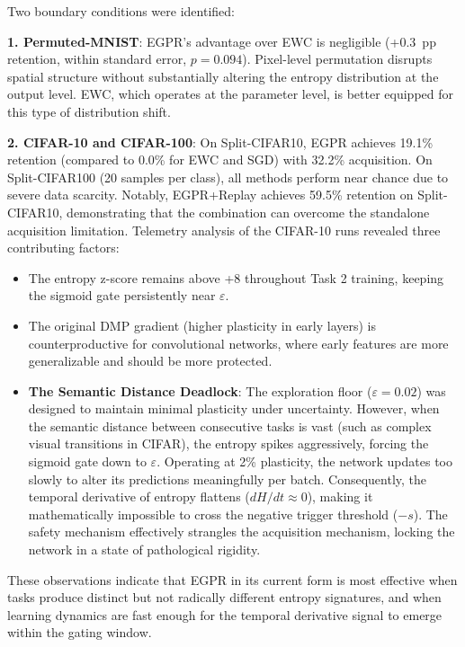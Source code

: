 \documentclass[11pt,a4paper]{article}
\begin{document}
Two boundary conditions were identified:

\textbf{1. Permuted-MNIST}: EGPR's advantage over EWC is negligible (+0.3~pp retention, within standard error, $p = 0.094$). Pixel-level permutation disrupts spatial structure without substantially altering the entropy distribution at the output level. EWC, which operates at the parameter level, is better equipped for this type of distribution shift.

\textbf{2. CIFAR-10 and CIFAR-100}: On Split-CIFAR10, EGPR achieves 19.1\% retention (compared to 0.0\% for EWC and SGD) with 32.2\% acquisition. On Split-CIFAR100 (20 samples per class), all methods perform near chance due to severe data scarcity. Notably, EGPR+Replay achieves 59.5\% retention on Split-CIFAR10, demonstrating that the combination can overcome the standalone acquisition limitation. Telemetry analysis of the CIFAR-10 runs revealed three contributing factors:

\begin{itemize}
    \item The entropy z-score remains above +8 throughout Task 2 training, keeping the sigmoid gate persistently near $\varepsilon$.
    \item The original DMP gradient (higher plasticity in early layers) is counterproductive for convolutional networks, where early features are more generalizable and should be more protected.
    \item \textbf{The Semantic Distance Deadlock}: The exploration floor ($\varepsilon = 0.02$) was designed to maintain minimal plasticity under uncertainty. However, when the semantic distance between consecutive tasks is vast (such as complex visual transitions in CIFAR), the entropy spikes aggressively, forcing the sigmoid gate down to $\varepsilon$. Operating at 2\% plasticity, the network updates too slowly to alter its predictions meaningfully per batch. Consequently, the temporal derivative of entropy flattens ($dH/dt \approx 0$), making it mathematically impossible to cross the negative trigger threshold ($-s$). The safety mechanism effectively strangles the acquisition mechanism, locking the network in a state of pathological rigidity.
\end{itemize}

These observations indicate that EGPR in its current form is most effective when tasks produce distinct but not radically different entropy signatures, and when learning dynamics are fast enough for the temporal derivative signal to emerge within the gating window.
\end{document}
